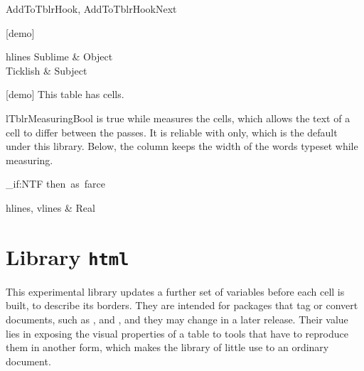 \begin{codedescribe}[
        code,
        new=2025A
    ]{AddToTblrHook, AddToTblrHookNext}
    \begin{codestore}[st=lib:hook:label]
        [demo]{}
        \begin{tblr}{hlines}
            Sublime  & Object  \\
            Ticklish & Subject
        \end{tblr}
        [demo]
        This table has  cells.\end{codestore}
    \begin{center}
    \end{center}
\end{codedescribe}

\begin{codedescribe}[
        code,
        new=2023A
    ]{lTblrMeasuringBool}
     is true while  measures the cells, which allows the text of a cell to differ between the passes. It is reliable with  only, which is the default under this library. Below, the column keeps the width of the words typeset while measuring.
\end{codedescribe}

\begin{codestore}[st=lib:hook:bool]
    \ExplSyntaxOn
    \NewDocumentCommand \PassName { }
    { \bool_if:NTF  { then~as~farce } }
    \ExplSyntaxOff
    \begin{tblr}{hlines, vlines}
        \PassName & Real
    \end{tblr}\end{codestore}
\begin{center}
\end{center}

\section{Library \texttt{html}}\label{lib:html}
This experimental library updates a further set of variables before each cell is built, to describe its borders. They are intended for packages that tag or convert documents, such as ,  and , and they may change in a later release. Their value lies in exposing the visual properties of a table to tools that have to reproduce them in another form, which makes the library of little use to an ordinary document.

